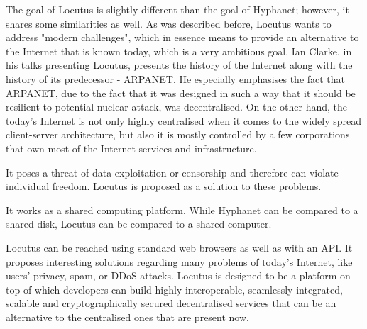 The goal of Locutus \cite{locutus} is slightly different than the goal of Hyphanet; however, it shares some similarities as well. As was described before, Locutus wants to address "modern challenges", which in essence means to provide an alternative to the Internet that is known today, which is a very ambitious goal.
Ian Clarke, in his talks presenting Locutus, presents the history of the Internet along with the history of its predecessor - ARPANET. He especially emphasises the fact that ARPANET, due to the fact that it was designed in such a way that it should be resilient to potential nuclear attack, was decentralised. On the other hand, the today's Internet is not only highly centralised when it comes to the widely spread client-server architecture, but also it is mostly controlled by a few corporations that own most of the Internet services and infrastructure.

It poses a threat of data exploitation or censorship and therefore can violate individual freedom. Locutus is proposed as a solution to these problems.

It works as a shared computing platform. While Hyphanet can be compared to a shared disk, Locutus can be compared to a shared computer.

Locutus can be reached using standard web browsers as well as with an API. It proposes interesting solutions regarding many problems of today’s Internet, like users' privacy, spam, or DDoS attacks. Locutus is designed to be a platform on top of which developers can build highly interoperable, seamlessly integrated, scalable and cryptographically secured decentralised services that can be an alternative to the centralised ones that are present now.

